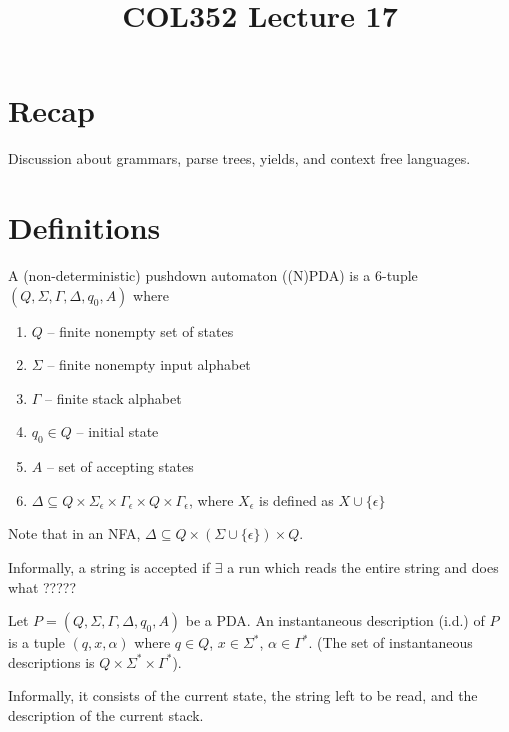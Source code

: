 \documentclass[a4paper]{article}
\title{\textbf{COL352 Lecture 17}}
\date{}
\newcommand{\nl}{\vspace{0.2cm}\\}
\begin{document}
\maketitle
\tableofcontents

\section{Recap}

Discussion about grammars, parse trees, yields, and context free languages.

\section{Definitions}

\begin{defn}
    A (non-deterministic) pushdown automaton ((N)PDA) is a 6-tuple $(Q, \Sigma, \Gamma, \Delta, q_0, A)$ where
    \begin{enumerate}
        \item $Q$ -- finite nonempty set of states
        \item $\Sigma$ -- finite nonempty input alphabet
        \item $\Gamma$ -- finite stack alphabet
        \item $q_0 \in Q$ -- initial state
        \item $A$ -- set of accepting states
        \item $\Delta \subseteq Q \times \Sigma_\epsilon \times \Gamma_\epsilon \times Q \times \Gamma_\epsilon$, where $X_\epsilon$ is defined as $X \cup \{\epsilon\}$
    \end{enumerate}
\end{defn}

Note that in an NFA, $\Delta \subseteq Q \times (\Sigma \cup \{\epsilon\}) \times Q$.

Informally, a string is accepted if $\exists$ a run which reads the entire string and does what ?????\nl

\begin{defn}
    Let $P = (Q, \Sigma, \Gamma, \Delta, q_0, A)$ be a PDA. An instantaneous description (i.d.) of $P$ is a tuple $(q, x, \alpha)$ where $q \in Q$, $x \in \Sigma^*$, $\alpha \in \Gamma^*$. (The set
    of instantaneous descriptions is $Q \times \Sigma^* \times \Gamma^*$).
\end{defn}

Informally, it consists of the current state, the string left to be read, and the description of the current stack.\nl
\end{document}
